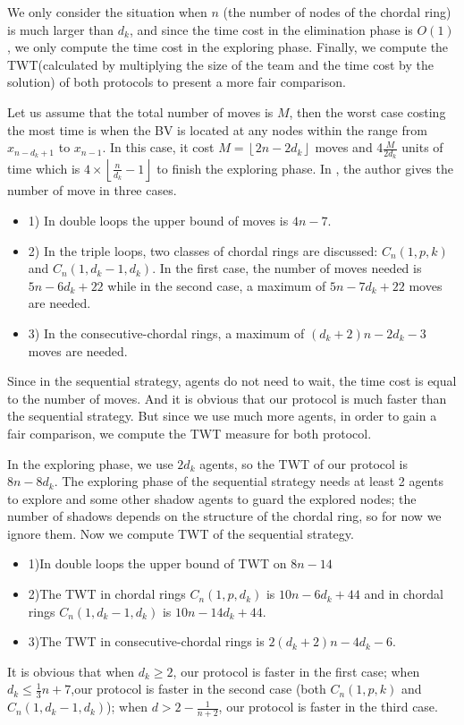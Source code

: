 
 
 

We only consider the situation when $n$ (the number of nodes of the chordal ring) is much larger than $d_k$, and since the time cost in the elimination phase is $O(1)$, we only compute the time cost in the exploring phase. Finally, we compute the TWT(calculated by multiplying the size of the team and the time cost by the solution) of both protocols to present a more fair comparison.

Let us assume that the total number of moves is $M$, then the worst case costing the most time is when the BV is located at any nodes within the range from $x_{n-d_k+1}$ to $x_{n-1}$. In this case, it cost $M=\left \lfloor 2n-2d_k\right \rfloor$ moves and 4$\frac{M}{2d_k}$ units of time which is $4\times \left \lfloor \frac{n}{d_k}-1\right \rfloor$ to finish the exploring phase. 
In \cite{alotaibi}, the author gives the number of move in three cases.
\begin{itemize}
\item 1) In double loops the upper bound of moves is $4n-7$.
\item 2) In the triple loops,  two classes of chordal rings are discussed: $C_n(1,p,k)$ and $C_n(1,d_k-1,d_k)$. In the first case, the number of moves needed is $5n-6d_k+22$ while in the second case, a maximum of $5n-7d_k+22$ moves are needed.
\item 3) In the consecutive-chordal rings, a maximum of $(d_k+2)n-2d_k-3$ moves are needed.
\end{itemize}
Since in the sequential strategy, agents do not need to wait, the time cost is equal to the number of moves. And it is obvious that our protocol is much faster than the sequential strategy. But since we use much more agents,   in order to gain a fair comparison,   we compute the TWT measure for both protocol.

In the exploring phase, we use $2d_k$ agents, so the TWT of our protocol is $8n-8d_k$. The exploring phase of the sequential strategy needs at least 2 agents to explore and some other shadow agents to guard the explored nodes;  the number of shadows depends on the structure of the chordal ring, so for now we ignore them. Now we compute TWT of the sequential strategy.
\begin{itemize}
\item 1)In double loops the upper bound of TWT on  $8n-14$
\item 2)The TWT in chordal rings $C_n(1,p,d_k)$ is $10n-6d_k+44$ and in chordal rings $C_n(1,d_k-1,d_k)$ is $10n-14d_k+44$.
\item 3)The TWT in consecutive-chordal rings is $2(d_k+2)n-4d_k-6$.
\end{itemize}
It is obvious that when $d_k\geq 2$, our protocol is faster in the  first case; when $d_k\leq \frac{1}{3}n+7$,our protocol is faster in the second case (both $C_n(1,p,k)$ and $C_n(1,d_k-1,d_k)$); when $d>2-\frac{1}{n+2}$, our protocol is faster in the third case.


